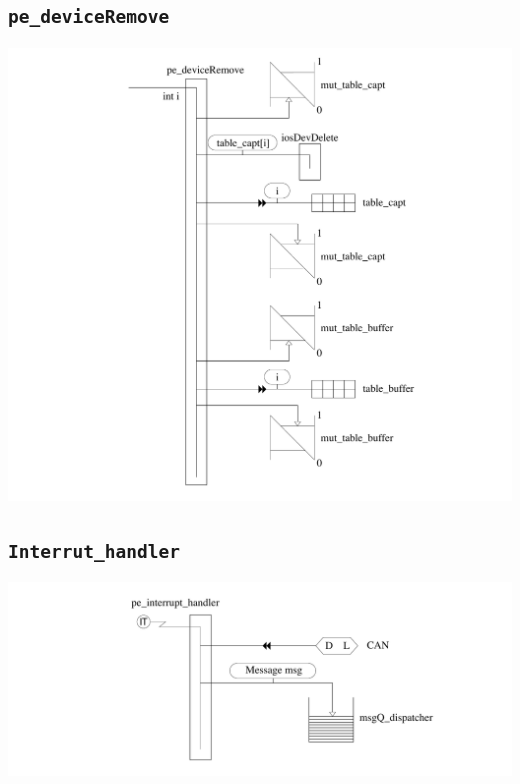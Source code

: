 \documentclass[11pt, a4paper]{article}
\newcommand{\kw}[1]{\texttt{#1}}
\begin{document}
\subsection{\kw{pe\_deviceRemove}}
\includegraphics[width=\textwidth]{ressources/pe_deviceRemove.pdf}
\subsection{\kw{Interrut\_handler}}
\includegraphics[width=\textwidth]{ressources/pe_interrupt_handler.pdf}
\end{document}
